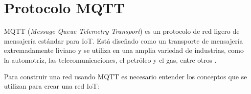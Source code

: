 





\section{Protocolo MQTT}

MQTT  (\textit{Message Queue Telemetry Transport}) es un protocolo de red ligero de mensajería estándar para IoT. Está diseñado como un transporte de mensajería extremadamente liviano y se utiliza en una amplia variedad de industrias, como la automotriz, las telecomunicaciones, el petróleo y el gas, entre otros  \citep{WEBSITE:4}. 

Para construir una red usando MQTT es necesario entender los conceptos que se utilizan para crear una red IoT: 

